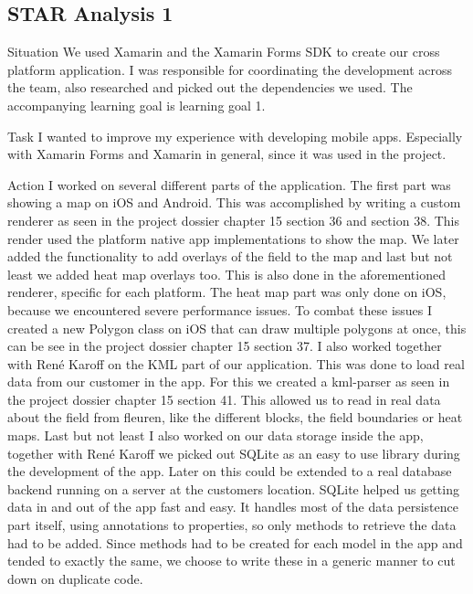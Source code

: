 \documentclass[12pt]{article}
\begin{document}
\subsection{STAR Analysis 1}
\begin{STAR}
    \item[Situation] We used Xamarin and the Xamarin Forms SDK to create our cross platform application. I was responsible for coordinating the development across the team, also researched and picked out the dependencies we used. The accompanying learning goal is learning goal 1.
    \item[Task] I wanted to improve my experience with developing mobile apps. Especially with Xamarin Forms and Xamarin in general, since it was used in the project.
    \item[Action] I worked on several different parts of the application.
    The first part was showing a map on iOS and Android. This was accomplished by writing a custom renderer as seen in the project dossier chapter 15 section 36 and section 38. This render used the platform native app implementations to show the map.
    We later added the functionality to add overlays of the field to the map and last but not least we added heat map overlays too. This is also done in the aforementioned renderer, specific for each platform. The heat map part was only done on iOS, because we encountered severe performance issues. To combat these issues I created a new Polygon class on iOS that can draw multiple polygons at once, this can be see in the project dossier chapter 15 section 37. 
    I also worked together with René Karoff on the KML part of our application. This was done to load real data from our customer in the app. For this we created a kml-parser as seen in the project dossier chapter 15 section 41. This allowed us to read in real data about the field from fleuren, like the different blocks, the field boundaries or heat maps.
    Last but not least I also worked on our data storage inside the app, together with René Karoff we picked out SQLite as an easy to use library during the development of the app. Later on this could be extended to a real database backend running on a server at the customers location. SQLite helped us getting data in and out of the app fast and easy. It handles most of the data persistence part itself, using annotations to properties, so only methods to retrieve the data had to be added. Since methods had to be created for each model in the app and tended to exactly the same, we choose to write these in a generic manner to cut down on duplicate code.
    

\end{STAR}
\end{document}
